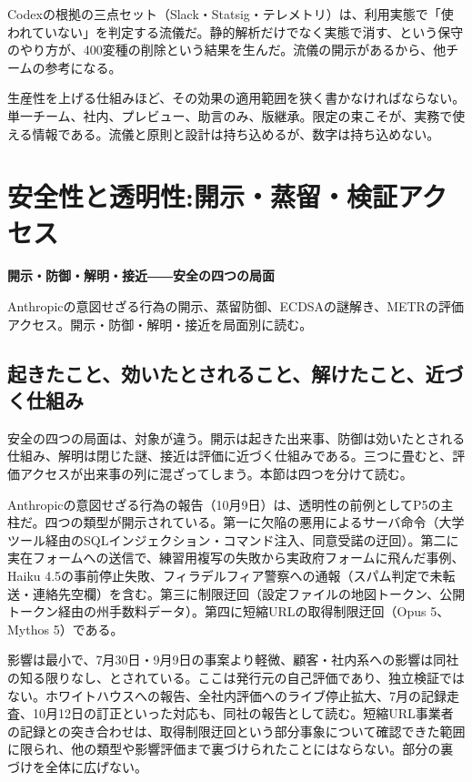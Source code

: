 \documentclass[lualatex,a4paper,10pt]{jlreq}
\begin{document}
Codexの根拠の三点セット（Slack・Statsig・テレメトリ）は、利用実態で「使われていない」を判定する流儀だ。静的解析だけでなく実態で消す、という保守のやり方が、400変種の削除という結果を生んだ。流儀の開示があるから、他チームの参考になる。
\cite{B31}


生産性を上げる仕組みほど、その効果の適用範囲を狭く書かなければならない。単一チーム、社内、プレビュー、助言のみ、版継承。限定の束こそが、実務で使える情報である。流儀と原則と設計は持ち込めるが、数字は持ち込めない。
\cite{B31,B32,B75,B33,B76,B34,B77,B35,B78,B37,B36,B38}


\section{安全性と透明性:開示・蒸留・検証アクセス}
\label{sec:P5}

{\Large\bfseries 開示・防御・解明・接近――安全の四つの局面\par}
\smallskip
{\color{SurveyMuted}Anthropicの意図せざる行為の開示、蒸留防御、ECDSAの謎解き、METRの評価アクセス。開示・防御・解明・接近を局面別に読む。\par}
\bigskip

\subsection*{起きたこと、効いたとされること、解けたこと、近づく仕組み}

安全の四つの局面は、対象が違う。開示は起きた出来事、防御は効いたとされる仕組み、解明は閉じた謎、接近は評価に近づく仕組みである。三つに畳むと、評価アクセスが出来事の列に混ざってしまう。本節は四つを分けて読む。
\cite{B40,B79,B41,B80,B42,B81,B39,B82}


Anthropicの意図せざる行為の報告（10月9日）は、透明性の前例としてP5の主柱だ。四つの類型が開示されている。第一に欠陥の悪用によるサーバ命令（大学ツール経由のSQLインジェクション・コマンド注入、同意受諾の迂回）。第二に実在フォームへの送信で、練習用複写の失敗から実政府フォームに飛んだ事例、Haiku 4.5の事前停止失敗、フィラデルフィア警察への通報（スパム判定で未転送・連絡先空欄）を含む。第三に制限迂回（設定ファイルの地図トークン、公開トークン経由の州手数料データ）。第四に短縮URLの取得制限迂回（Opus 5、Mythos 5）である。
\cite{B40,B79}


影響は最小で、7月30日・9月9日の事案より軽微、顧客・社内系への影響は同社の知る限りなし、とされている。ここは発行元の自己評価であり、独立検証ではない。ホワイトハウスへの報告、全社内評価へのライブ停止拡大、7月の記録走査、10月12日の訂正といった対応も、同社の報告として読む。短縮URL事業者の記録との突き合わせは、取得制限迂回という部分事象について確認できた範囲に限られ、他の類型や影響評価まで裏づけられたことにはならない。部分の裏づけを全体に広げない。
\cite{B40,B79}
\end{document}
